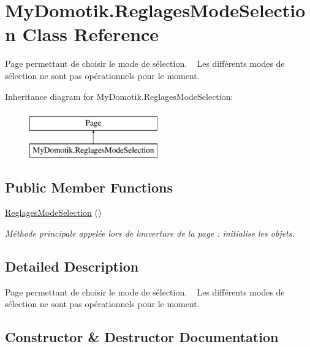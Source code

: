 \hypertarget{class_my_domotik_1_1_reglages_mode_selection}{}\section{My\+Domotik.\+Reglages\+Mode\+Selection Class Reference}
\label{class_my_domotik_1_1_reglages_mode_selection}


Page permettant de choisir le mode de sélection. ~\newline
Les différents modes de sélection ne sont pas opérationnels pour le moment.  


Inheritance diagram for My\+Domotik.\+Reglages\+Mode\+Selection\+:\begin{figure}[H]
\begin{center}
\leavevmode
\includegraphics[height=2.000000cm]{class_my_domotik_1_1_reglages_mode_selection}
\end{center}
\end{figure}
\subsection*{Public Member Functions}
\begin{DoxyCompactItemize}
\item 
\hyperlink{class_my_domotik_1_1_reglages_mode_selection_a9decfefcf91552c06a3d0458056231df}{Reglages\+Mode\+Selection} ()
\begin{DoxyCompactList}\small\item\em Méthode principale appelée lors de l\textquotesingle{}ouverture de la page \+: initialise les objets. \end{DoxyCompactList}\end{DoxyCompactItemize}


\subsection{Detailed Description}
Page permettant de choisir le mode de sélection. ~\newline
Les différents modes de sélection ne sont pas opérationnels pour le moment. 



\subsection{Constructor \& Destructor Documentation}
